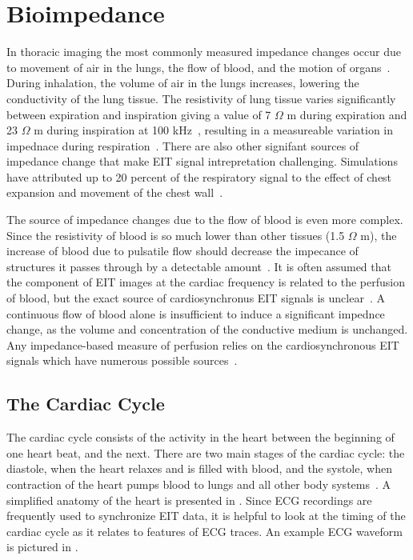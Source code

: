 \section{Bioimpedance}
\label{sec:bioimpedance}
In thoracic imaging the most commonly measured 
impedance changes occur due to movement 
of air in the lungs, the flow of blood, and the motion of 
organs~\parencite{adler_electrical_2017}. 
During inhalation, the volume of air in the lungs increases, lowering the 
conductivity of the lung tissue. 
The resistivity of lung tissue varies significantly
between expiration and inspiration giving a value of 7 $\Omega$ m during expiration
and 23 $\Omega$ m during inspiration at 100 kHz~\parencite{witsoe_electrical_1967},
resulting in a
measureable variation in impednace during respiration~\parencite{eyuboglu_vivo_1989}. 
There are also other 
signifant sources of impedance change that make EIT signal intrepretation 
challenging. Simulations have attributed up to 20
percent of the respiratory signal to the effect of 
chest expansion and movement of the chest 
wall~\parencite{adler_impedance_1994}.

The source of impedance changes due to the flow of blood is even more complex. 
Since the resistivity of blood is so much lower than other tissues 
(1.5 $\Omega$ m), the increase of blood due to pulsatile 
flow should decrease the impecance of structures it passes through 
by a detectable amount~\parencite{eyuboglu_vivo_1989}.
It is often assumed that the component of EIT images at the cardiac 
frequency is related to the perfusion of blood, but the exact source of
cardiosynchronus EIT signals is 
unclear~\parencite{patterson_impedance_2010,nguyen_review_2012}.
A continuous flow of blood alone is insufficient 
to induce a significant impednce change, 
as the volume and concentration of the conductive medium is unchanged. 
Any impedance-based measure of perfusion relies on the cardiosynchronous 
EIT signals which have numerous possible sources~\parencite{adler_origins_2017}. 

\subsection{The Cardiac Cycle}
The cardiac cycle consists of the activity in the heart between the
beginning of one heart beat, and the next. There are two main stages 
of the cardiac cycle: the diastole, when the heart relaxes and is filled 
with blood, and the systole, when contraction of the heart pumps blood to
lungs and all other body systems~\parencite{pappano_cardiovascular_2019}. 
A simplified anatomy of the heart is 
presented in . 
Since ECG recordings are frequently used to synchronize 
EIT data, it is helpful to look at the timing of the cardiac cycle as it 
relates to features of ECG traces. An example ECG waveform is pictured in 
. 

